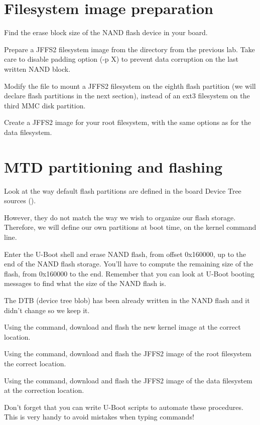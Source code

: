 \section{Filesystem image preparation}

Find the erase block size of the NAND flash device in your board.

Prepare a JFFS2 filesystem image from the 
directory from the previous lab. Take care to disable padding option
(-p X) to prevent data corruption on the last written NAND block.

Modify the  file to mount a JFFS2 filesystem on
the eighth flash partition (we will declare flash partitions in the
next section), instead of an ext3 filesystem on the third MMC disk
partition.

Create a JFFS2 image for your root filesystem, with the same options
as for the data filesystem.

\section{MTD partitioning and flashing}

Look at the way default flash partitions are defined in the board
Device Tree sources
().

However, they do not match the way we wish to organize our flash
storage. Therefore, we will define our own partitions at boot time,
on the kernel command line.

Enter the U-Boot shell and erase NAND flash, from offset 0x160000,
up to the end of the NAND flash storage. You'll have to compute the
remaining size of the flash, from 0x160000 to the end. Remember that
you can look at U-Boot booting messages to find what the size of
the NAND flash is.

The DTB (device tree blob) has been already written in the NAND flash
and it didn't change so we keep it.

Using the  command, download and flash the new kernel
image at the correct location.

Using the  command, download and flash the JFFS2 image
of the root filesystem the correct location.

Using the  command, download and flash the JFFS2 image of
the data filesystem at the correction location.

Don't forget that you can write U-Boot scripts to automate these
procedures. This is very handy to avoid mistakes when typing commands!

